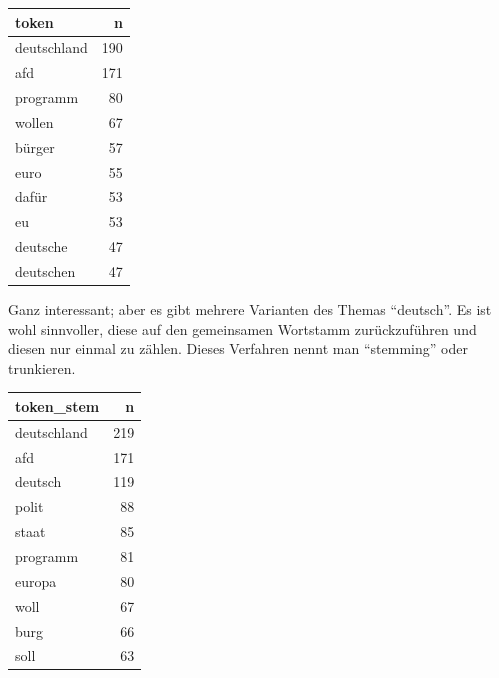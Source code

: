 \documentclass[12pt,]{book}
\makeatletter
\newenvironment{Shaded}{\begin{snugshade}}{\end{snugshade}}
\newcommand{\KeywordTok}[1]{\textcolor[rgb]{0.13,0.29,0.53}{\textbf{{#1}}}}
\newcommand{\DataTypeTok}[1]{\textcolor[rgb]{0.13,0.29,0.53}{{#1}}}
\newcommand{\DecValTok}[1]{\textcolor[rgb]{0.00,0.00,0.81}{{#1}}}
\newcommand{\StringTok}[1]{\textcolor[rgb]{0.31,0.60,0.02}{{#1}}}
\newcommand{\OtherTok}[1]{\textcolor[rgb]{0.56,0.35,0.01}{{#1}}}
\newcommand{\NormalTok}[1]{{#1}}
\newenvironment{kframe}{%
\medskip{}
\setlength{\fboxsep}{.8em}
 \def\at@end@of@kframe{}%
 \ifinner\ifhmode%
  \def\at@end@of@kframe{\end{minipage}}%
  \begin{minipage}{\columnwidth}%
 \fi\fi%
 \def\FrameCommand##1{\hskip\@totalleftmargin \hskip-\fboxsep
 \colorbox{shadecolor}{##1}\hskip-\fboxsep
     \hskip-\linewidth \hskip-\@totalleftmargin \hskip\columnwidth}%
 \MakeFramed {\advance\hsize-\width
   \@totalleftmargin\z@ \linewidth\hsize
   \@setminipage}}%
 {\par\unskip\endMakeFramed%
 \at@end@of@kframe}
\renewenvironment{Shaded}{\begin{kframe}}{\end{kframe}}
\makeatother
\begin{document}
\begin{tabular}{l|r}
\hline
token & n\\
\hline
deutschland & 190\\
\hline
afd & 171\\
\hline
programm & 80\\
\hline
wollen & 67\\
\hline
bürger & 57\\
\hline
euro & 55\\
\hline
dafür & 53\\
\hline
eu & 53\\
\hline
deutsche & 47\\
\hline
deutschen & 47\\
\hline
\end{tabular}

Ganz interessant; aber es gibt mehrere Varianten des Themas ``deutsch''.
Es ist wohl sinnvoller, diese auf den gemeinsamen Wortstamm
zurückzuführen und diesen nur einmal zu zählen. Dieses Verfahren nennt
man ``stemming'' oder trunkieren.

\begin{Shaded}
\end{Shaded}

\begin{tabular}{l|r}
\hline
token\_stem & n\\
\hline
deutschland & 219\\
\hline
afd & 171\\
\hline
deutsch & 119\\
\hline
polit & 88\\
\hline
staat & 85\\
\hline
programm & 81\\
\hline
europa & 80\\
\hline
woll & 67\\
\hline
burg & 66\\
\hline
soll & 63\\
\hline
\end{tabular}
\end{document}
